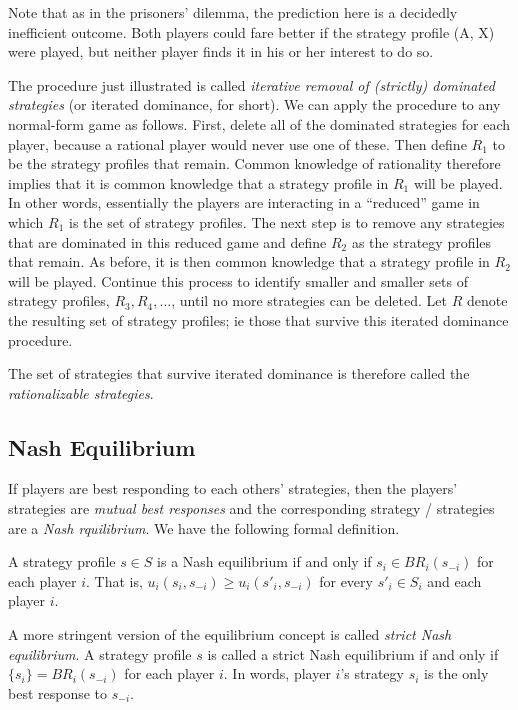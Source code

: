 Note that as in the prisoners’ dilemma, the prediction here is a decidedly inefficient outcome. Both players could fare better if the strategy profile
(A, X) were played, but neither player finds it in his or her interest to do so.

The procedure just illustrated is called \emph{iterative removal of (strictly) dominated strategies} (or iterated dominance, for short). We can apply the procedure to any normal-form game as follows. First, delete all of the dominated strategies for each player, because a rational player would never use one of these. Then define $R_1$ to be the strategy profiles that remain. Common knowledge of rationality therefore implies that it is common knowledge that a strategy profile in $R_1$ will be played. In other words, essentially the players are interacting in a “reduced” game in which $R_1$ is the set of strategy profiles. The next step is to remove any strategies that are dominated in this reduced game and define $R_2$ as the strategy profiles that remain. As before, it is then common knowledge that a strategy profile in $R_2$ will be played. Continue this process to identify smaller and smaller sets of strategy profiles, $R_3, R_4, \ldots$, until no more strategies can be deleted. Let $R$ denote the resulting set of strategy profiles; ie those that survive this iterated dominance procedure.

The set of strategies that survive iterated dominance is therefore called the \emph{rationalizable strategies}.

\subsection{Nash Equilibrium}

If players are best responding to each others’ strategies, then the players’ strategies are \emph{mutual best responses} and the corresponding strategy / strategies are a \emph{Nash rquilibrium}. We have the following formal definition.

\begin{definition}
    A strategy profile $s \in S$ is a Nash equilibrium if and only if $s_i \in BR_i(s_{-i})$ for each player $i$. That is, $u_i(s_i , s_{-i}) \geq u_i(s'_i , s_{-i})$ for every $s'_i \in S_i$ and each player $i$.
\end{definition}

A more stringent version of the equilibrium concept is called \emph{strict Nash equilibrium}. A strategy profile $s$ is called a strict Nash equilibrium if and only if $\{s_i\} = BR_i(s_{-i})$ for each player $i$. In words, player $i$’s strategy $s_i$ is the only best response to $s_{-i}$.

